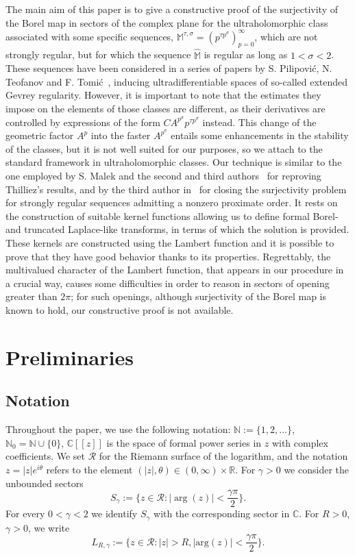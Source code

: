\documentclass[12pt,leqno]{amsart}
\newcommand{\R}{\mathbb{R}}
\def\C{\mathbb{C}}
\def\N{\mathbb{N}}
\theoremstyle{plain}
\theoremstyle{definition}
\numberwithin{equation}{section}
\def\M{\mathbb{M}}
\newcommand{\hM}{\widehat{\M}}
\begin{document}
The main aim of this paper is to give a constructive proof of the surjectivity of the Borel map in sectors of the complex plane for the ultraholomorphic class associated with some specific sequences, $\M^{\tau,\sigma}=(p^{\tau p^{\sigma}})_{p=0}^\infty$, which are not strongly regular, but for which the sequence $\hM$ is regular as long as $1<\sigma<2$. These sequences have been considered in a series of papers by S. Pilipovi{\'c}, N. Teofanov and F. Tomi{\'c}~\cite{ptt15,ptt16,ptt,ptt21}, inducing ultradifferentiable spaces of so-called extended Gevrey regularity. However, it is important to note that the estimates they impose on the elements of those classes are different, as their derivatives are controlled by expressions of the form $CA^{p^\sigma}p^{\tau p^{\sigma}}$ instead. This change of the geometric factor $A^{p}$ into the faster $A^{p^\sigma}$ entails some enhancements in the stability of the classes, but it is not well suited for our purposes, so we attach to the standard framework in ultraholomorphic classes. Our technique is similar to the one employed by S. Malek and the second and third authors~\cite{lastramaleksanzJMAA12} for reproving Thilliez's results, and by the third author in~\cite[Theorem\ 6.1]{SanzFlatProxOrder} for closing the surjectivity problem for strongly regular sequences admitting a nonzero proximate order. It rests on the construction of suitable kernel functions allowing us to define formal Borel- and truncated Laplace-like transforms, in terms of which the solution is provided. These kernels are constructed using the Lambert function and it is possible to prove that they have good behavior thanks to its properties. Regrettably, the multivalued character of the Lambert function, that appears in our procedure in a crucial way, causes some difficulties in order to reason in sectors of opening greater than $2\pi$; for such openings, although surjectivity of the Borel map is known to hold, our constructive proof is not available.






\section{Preliminaries}

\subsection{Notation} Throughout the paper, we use the following notation:  $\N:=\{1,2,\dots \}$, $\N_0=\N\cup\{0\}$, $\C[[z]]$ is the space of formal power series in $z$ with complex coefficients.
We set $\mathcal{R}$ for the Riemann surface of the logarithm, and the notation $z=|z|e^{i\theta}$ refers to the element $(|z|,\theta)\in(0,\infty)\times\R$. For $\gamma>0$ we consider the unbounded sectors
$$S_{\gamma}:=\{z\in \mathcal{R} : |\arg(z)|<\frac{\gamma\pi}{2}\}.$$
For every $0<\gamma<2$ we identify $S_\gamma$ with the corresponding sector in $\C$. For $R>0$, $\gamma>0$, we write
$$L_{R,\gamma}:=\{z\in \mathcal{R} :|z|>R,|\text{arg} (z)|<\frac{\gamma\pi}{2}\}.$$
\end{document}
